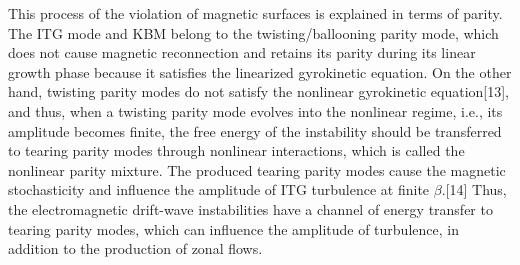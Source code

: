 \documentclass[11pt,a4paper]{article}
\begin{document}
\begin{itemize}
	This process of the violation of magnetic surfaces is explained in terms of parity. The ITG mode and KBM belong to the twisting/ballooning parity mode, which does not cause magnetic reconnection and retains its parity during its linear growth phase because it satisfies the linearized gyrokinetic equation. On the other hand, twisting parity modes do not satisfy the nonlinear gyrokinetic equation[13], and thus, when a twisting parity mode evolves into the nonlinear regime, i.e., its amplitude becomes finite, the free energy of the instability should be transferred to tearing parity modes through nonlinear interactions, which is called the nonlinear parity mixture. The produced tearing parity modes cause the magnetic stochasticity and influence the amplitude of ITG turbulence at finite $\beta$.[14] Thus, the electromagnetic drift-wave instabilities have a channel of energy transfer to tearing parity modes, which can influence the amplitude of turbulence, in addition to the production of zonal flows.
	
	\end{itemize}

\newpage

\section{}
\end{document}
